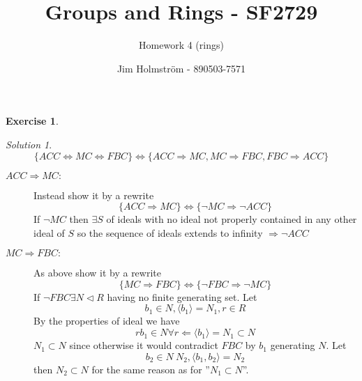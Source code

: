 \documentclass[a4paper,twoside=false,abstract=false,numbers=noenddot,
titlepage=false,headings=small,parskip=half,version=last]{scrartcl}
\author{Jim Holmström - 890503-7571}
\title{Groups and Rings - SF2729}
\subtitle{Homework 4 (rings)}
\theoremstyle{definition}
\newtheorem{exercise}{Exercise}
\theoremstyle{remark}
\newtheorem*{solution}{Solution}
\begin{document}
\maketitle
\thispagestyle{empty}

\begin{exercise}
{\bf
}
\end{exercise}
\begin{solution}

\begin{equation}
    \{ACC\Leftrightarrow MC\Leftrightarrow FBC\}
    \Leftrightarrow
    \{ACC\Rightarrow MC,MC\Rightarrow FBC,FBC\Rightarrow ACC\}
\end{equation} 

\begin{description}
    \item[$ACC\Rightarrow MC:$] 
        Instead show it by a rewrite
        \begin{equation}
            \{ACC\Rightarrow MC\}\Leftrightarrow \{\lnot{MC}\Rightarrow \lnot{ACC}\}
        \end{equation}
        If $\lnot{MC}$ then $\exists S$ of ideals with no ideal not properly
        contained in any other ideal of $S$ so the sequence of ideals extends
        to infinity $\Rightarrow \lnot{ACC}$
    \item[$MC\Rightarrow FBC:$]
        As above show it by a rewrite
        \begin{equation}
            \{MC\Rightarrow FBC\}\Leftrightarrow \{\lnot{FBC}\Rightarrow\lnot{MC}\}
        \end{equation}
        If $\lnot{FBC} \exists N \lhd R$ having no finite generating set. 
        Let
        \begin{equation}
            b_1 \in N, \langle b_1 \rangle=N_1,r \in R
        \end{equation}
        By the properties of ideal we have
        \begin{equation}
            rb_1 \in N \forall r \Leftarrow \langle b_1 \rangle=N_1 \subset N 
        \end{equation}
        $N_1 \subset N$ since otherwise it would contradict $FBC$ by $b_1$
        generating $N$.
        Let 
        \begin{equation}
            b_2\in N\ N_2, \langle b_1,b_2 \rangle =N_2
        \end{equation}
        then $N_2 \subset N$ for the same reason as for ''$N_1 \subset N$''.
        \begin{equation}

\end{equation}
\end{description}
\end{solution}
\end{document}
